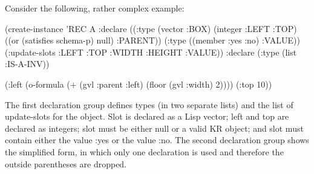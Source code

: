 Consider the following, rather complex example:
\begin{programexample}
(create-instance 'REC A
  :declare ((:type (vector :BOX)
		   (integer :LEFT :TOP)
		   ((or (satisfies schema-p) null) :PARENT))
	    (:type ((member :yes :no) :VALUE))
	    (:update-slots :LEFT :TOP :WIDTH :HEIGHT :VALUE))
  :declare (:type (list :IS-A-INV))

  (:left (o-formula (+ (gvl :parent :left) (floor (gvl :width) 2))))
  (:top 10))
\end{programexample}

The first declaration group defines types (in two separate lists) and
the list of update-slots for the object.  Slot  is declared as
a Lisp vector; left and top are declared as integers; slot 
must be either null or a valid KR object; and slot  must
contain either the value :yes or the value :no.  The second
declaration group shows the simplified form, in which only one
declaration is used and therefore the outside parentheses are dropped.

